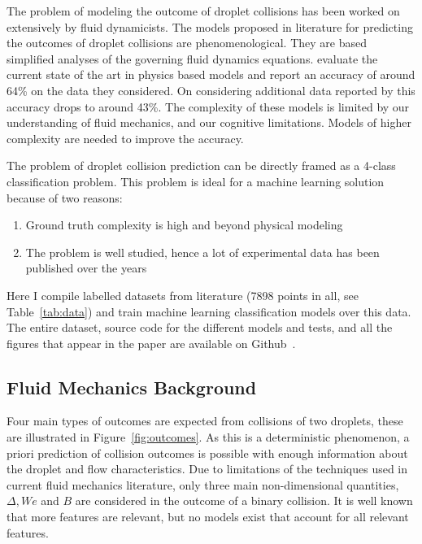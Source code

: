 \documentclass{article}
\begin{document}
The problem of modeling the outcome of droplet collisions has been worked on extensively by fluid dynamicists. The models proposed in literature for predicting the outcomes of droplet collisions are phenomenological. They are based simplified analyses of the governing fluid dynamics equations. \citet{agarwal2019computational} evaluate the current state of the art in physics based models and report an accuracy of around 64\% on the data they considered. On considering additional data reported by \citet{sommerfeld2016modelling} this accuracy drops to around 43\%. The complexity of these models is limited by our understanding of fluid mechanics, and our cognitive limitations. Models of higher complexity are needed to improve the accuracy.

The problem of droplet collision prediction can be directly framed as a 4-class classification problem. This problem is ideal for a machine learning solution because of two reasons:
\begin{enumerate}
\item Ground truth complexity is high and beyond physical modeling
\item The problem is well studied, hence a lot of experimental data has been published over the years
\end{enumerate}
Here I compile labelled datasets from literature (7898 points in all, see Table~\ref{tab:data}) and train machine learning classification models over this data. The entire dataset, source code for the different models and tests, and all the figures that appear in the paper are available on Github~\cite{githubrepo}.



\subsection{Fluid Mechanics Background}
\label{sec:background}
Four main types of outcomes are expected from collisions of two droplets, these are illustrated in Figure~\ref{fig:outcomes}. As this is a deterministic phenomenon, a priori prediction of collision outcomes is possible with enough information about the droplet and flow characteristics. Due to limitations of the techniques used in current fluid mechanics literature, only three main non-dimensional quantities, $\Delta, We$ and $B$ are considered in the outcome of a binary collision. It is well known that more features are relevant, but no models exist that account for all relevant features.
\end{document}
